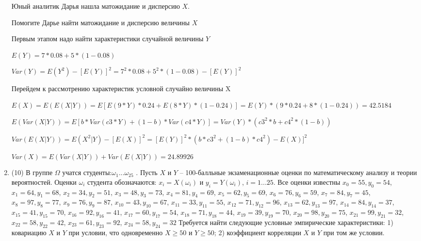 \documentclass[a4paper,12pt]{article}
\begin{document}
\begin{enumerate}
	Юный аналитик Дарья нашла матожидание и дисперсию $X$.

	Помогите Дарье найти матожидание и дисперсию величины $X$
	


	

	Первым этапом надо найти характеристики случайной величины $Y$

	$E(Y) = 7 * 0.08 + 5 * (1 - 0.08)$

	$Var(Y) = E(Y^2) - [E(Y)]^2 = 7^2 * 0.08 + 5^2 * (1 - 0.08) - [E(Y)]^2$


	Перейдем к рассмотрению характеристик условной случайно величины X

	$E(X) = E(E(X|Y)) = E[E(9 * Y) * 0.24 + E(8 * Y) * (1 - 0.24)] = E(Y) * (9 * 0.24 + 8 * (1 - 0.24)) = 42.5184$

	$E(Var(X|Y)) = E[b * Var(c3 * Y) + (1 - b) * Var(c4 * Y)] = Var(Y) * (c3^2 * b + c4^2 * (1- b)) $

	$Var(E(X|Y)) = E(X^2|Y) - [E(X)]^2 = [E(Y)]^2 * (b * c3^2 + (1-b)*c4^2) - E(X)]^2$

	$Var(X) = E(Var(X|Y)) + Var(E(X|Y)) = 24.89926$
	

\item


(10) В группе $\Omega$ учатся студенты:$\omega _{1}...\omega _{25}$ . Пусть $X$ и $Y$ – 100-балльные экзаменационные оценки по
математическому анализу и теории вероятностей. Оценки $\omega _{i}$ студента обозначаются: $x _{i} = X(\omega _{i})$ и $y _{i} = Y(\omega _{i})$, $i = 1...25$. Все оценки известны
$x _{0} = 55, y _{0} = 54$, $x _{1} = 64, y _{1} = 68$, $x _{2} = 34, y _{2} = 51$, $x _{3} = 48, y _{3} = 73$, $x _{4} = 81, y _{4} = 69$, $x _{5} = 62, y _{5} = 69$, $x _{6} = 76, y _{6} = 59$, $x _{7} = 84, y _{7} = 45$, $x _{8} = 97, y _{8} = 77$, $x _{9} = 76, y _{9} = 87$, $x _{10} = 43, y _{10} = 67$, $x _{11} = 33, y _{11} = 55$, $x _{12} = 71, y _{12} = 96$, $x _{13} = 62, y _{13} = 97$, $x _{14} = 84, y _{14} = 37$, $x _{15} = 41, y _{15} = 70$, $x _{16} = 92, y _{16} = 41$, $x _{17} = 60, y _{17} = 54$, $x _{18} = 71, y _{18} = 44$, $x _{19} = 39, y _{19} = 70$, $x _{20} = 98, y _{20} = 75$, $x _{21} = 99, y _{21} = 32$, $x _{22} = 58, y _{22} = 42$, $x _{23} = 61, y _{23} = 92$, $x _{24} = 58, y _{24} = 32$
Требуется
найти следующие условные эмпирические характеристики: 1) ковариацию $X$ и $Y$ при условии, что одновременно $X \geqslant 50$
 и $Y \geqslant 50$; 2) коэффициент корреляции $X$ и $Y$ при том же условии.





\end{enumerate}
\end{document}
